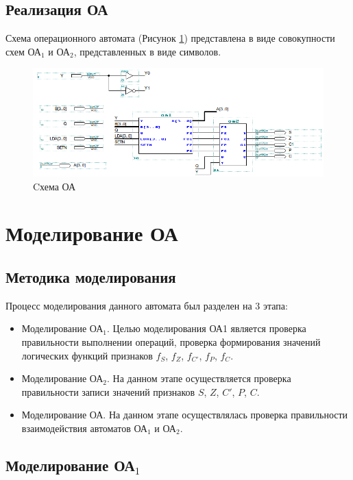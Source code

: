 \clearpage
\subsection{Реализация ОА}

Схема операционного автомата (Рисунок \ref{figure:oalog}) представлена в виде совокупности схем ОА${}_1$ и ОА${}_2$, представленных в виде символов.

\begin{figure}[H]
	\includegraphics[scale=0.6]{images/altera/rev2/oa_WITH_CONTROL_SIGNAL.png}
	\caption{Cхема ОА}
	\label{figure:oalog}
\end{figure}

\newpage
\section{Моделирование ОА}

\subsection{Методика моделирования}

Процесс моделирования данного автомата был разделен на 3 этапа:
\begin{itemize}
	\item Моделирование ОА$_1$. Целью моделирования ОА1 является проверка правильности выполнении операций, проверка формирования значений логических функций признаков $f_S$, $f_Z$, $f_{C'}$, $f_P$, $f_C$. 
	\item Моделирование ОА$_2$. На данном этапе осуществляется проверка правильности записи значений признаков $S$, $Z$, $C'$, $P$, $C$.
	\item Моделирование ОА. На данном этапе осуществлялась проверка правильности взаимодействия автоматов ОА$_1$ и ОА$_2$. 
\end{itemize}

\subsection{Моделирование ОА$_1$}

